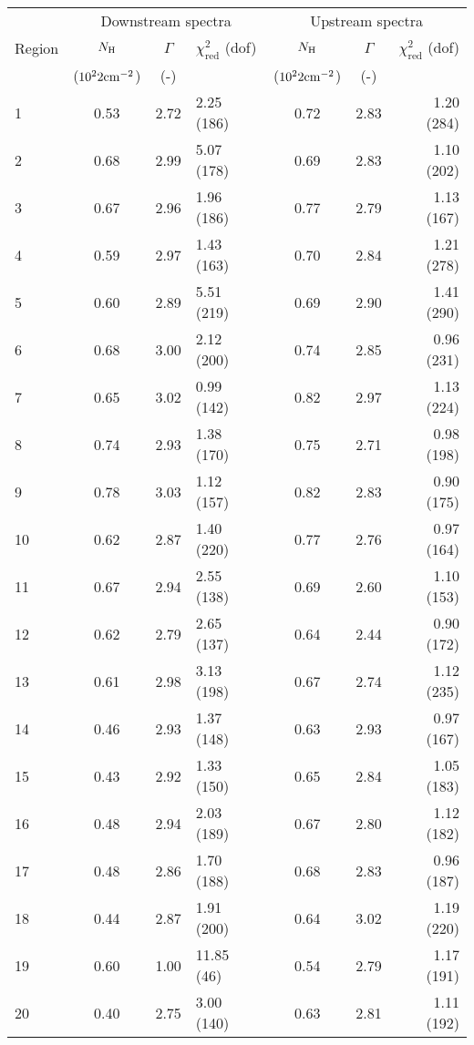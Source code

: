 \begin{tabular}{@{}lcclccr@{}}
\toprule
{} & \multicolumn{3}{c}{Downstream spectra}
   & \multicolumn{3}{c}{Upstream spectra} \\
\cmidrule(lr){2-4} \cmidrule(l){5-7}
Region & $N_{\mathrm{H}}$ & $\Gamma$ & $\chi^2_{\mathrm{red}}$ (dof)
       & $N_{\mathrm{H}}$ & $\Gamma$ & $\chi^2_{\mathrm{red}}$ (dof) \\
{} & ($10^22 \mathrm{cm}^{-2}$) & (-) & {}
   & ($10^22 \mathrm{cm}^{-2}$) & (-) & {} \\
\midrule
1  & 0.53 & 2.72 & 2.25 (186) & 0.72 & 2.83 & 1.20 (284) \\
2  & 0.68 & 2.99 & 5.07 (178) & 0.69 & 2.83 & 1.10 (202) \\
3  & 0.67 & 2.96 & 1.96 (186) & 0.77 & 2.79 & 1.13 (167) \\
\cmidrule{1-7}
4  & 0.59 & 2.97 & 1.43 (163) & 0.70 & 2.84 & 1.21 (278) \\
5  & 0.60 & 2.89 & 5.51 (219) & 0.69 & 2.90 & 1.41 (290) \\
6  & 0.68 & 3.00 & 2.12 (200) & 0.74 & 2.85 & 0.96 (231) \\
7  & 0.65 & 3.02 & 0.99 (142) & 0.82 & 2.97 & 1.13 (224) \\
8  & 0.74 & 2.93 & 1.38 (170) & 0.75 & 2.71 & 0.98 (198) \\
9  & 0.78 & 3.03 & 1.12 (157) & 0.82 & 2.83 & 0.90 (175) \\
10 & 0.62 & 2.87 & 1.40 (220) & 0.77 & 2.76 & 0.97 (164) \\
\cmidrule{1-7}
11 & 0.67 & 2.94 & 2.55 (138) & 0.69 & 2.60 & 1.10 (153) \\
12 & 0.62 & 2.79 & 2.65 (137) & 0.64 & 2.44 & 0.90 (172) \\
13 & 0.61 & 2.98 & 3.13 (198) & 0.67 & 2.74 & 1.12 (235) \\
\cmidrule{1-7}
14 & 0.46 & 2.93 & 1.37 (148) & 0.63 & 2.93 & 0.97 (167) \\
15 & 0.43 & 2.92 & 1.33 (150) & 0.65 & 2.84 & 1.05 (183) \\
16 & 0.48 & 2.94 & 2.03 (189) & 0.67 & 2.80 & 1.12 (182) \\
17 & 0.48 & 2.86 & 1.70 (188) & 0.68 & 2.83 & 0.96 (187) \\
\cmidrule{1-7}
18 & 0.44 & 2.87 & 1.91 (200) & 0.64 & 3.02 & 1.19 (220) \\
19 & 0.60 & 1.00 & 11.85 (46) & 0.54 & 2.79 & 1.17 (191) \\
20 & 0.40 & 2.75 & 3.00 (140) & 0.63 & 2.81 & 1.11 (192) \\
\bottomrule
\end{tabular}
